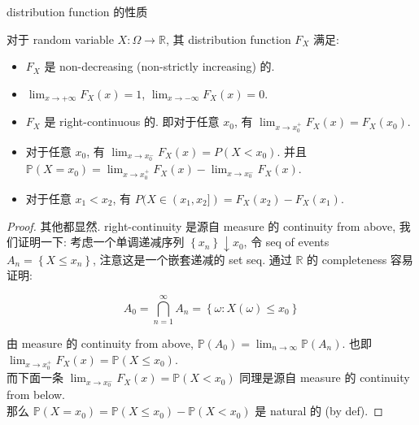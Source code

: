 \documentclass{qlnotes-export}
\begin{document}
\begin{theorem}{distribution function 的性质}\label{thm-02-random-variables-distribution-function}

对于 random variable \(X:\Omega\rightarrow{\mathbb{R}}\), 其 distribution function \(F_{X}\) 满足:

\begin{itemize}
\item
  \(F_{X}\) 是 non-decreasing (non-strictly increasing) 的.
\item
  \(\lim_{x\rightarrow + \infty}F_{X}(x) = 1\), \(\lim_{x\rightarrow - \infty}F_{X}(x) = 0\).
\item
  \(F_{X}\) 是 right-continuous 的. 即对于任意 \(x_{0}\), 有 \(\lim_{x\rightarrow x_{0}^{+}}F_{X}(x) = F_{X}(x_{0})\).
\item
  对于任意 \(x_{0}\), 有 \(\lim_{x\rightarrow x_{0}^{-}}F_{X}(x) = P(X < x_{0})\). 并且 \({\mathbb{P}}(X = x_{0}) = \lim_{x\rightarrow x_{0}^{+}}F_{X}(x) - \lim_{x\rightarrow x_{0}^{-}}F_{X}(x)\).
\item
  对于任意 \(x_{1} < x_{2}\), 有 \(P(X \in (x_{1},x_{2}\rbrack) = F_{X}(x_{2}) - F_{X}(x_{1})\).
\end{itemize}

\end{theorem}

\begin{proof}

其他都显然. right-continuity 是源自 measure 的 continuity from above, 我们证明一下: 考虑一个单调递减序列 \(\left\{ x_{n} \right\} \downarrow x_{0}\), 令 seq of events \(A_{n} = \left\{ {X \leq x_{n}} \right\}\), 注意这是一个嵌套递减的 set seq. 通过 \(\mathbb{R}\) 的 completeness 容易证明:

\[A_{0} = \bigcap\limits_{n = 1}^{\infty}A_{n} = \left\{ {\omega:X(\omega) \leq x_{0}} \right\}\]

由 measure 的 continuity from above, \({\mathbb{P}}(A_{0}) = \lim_{n\rightarrow\infty}{\mathbb{P}}(A_{n})\). 也即 \(\lim_{x\rightarrow x_{0}^{+}}F_{X}(x) = {\mathbb{P}}(X \leq x_{0})\).\\
而下面一条 \(\lim_{x\rightarrow x_{0}^{-}}F_{X}(x) = {\mathbb{P}}(X < x_{0})\) 同理是源自 measure 的 continuity from below.\\
那么 \({\mathbb{P}}(X = x_{0}) = {\mathbb{P}}(X \leq x_{0}) - {\mathbb{P}}(X < x_{0})\) 是 natural 的 (by def).

\end{proof}
\end{document}
